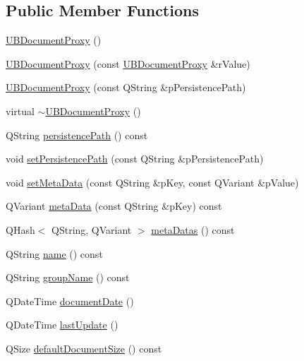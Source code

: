\subsection*{Public Member Functions}
\begin{DoxyCompactItemize}
\item 
\hyperlink{class_u_b_document_proxy_a0cd3253e9c34295bb742da0faf9e69d6}{U\-B\-Document\-Proxy} ()
\item 
\hyperlink{class_u_b_document_proxy_af5f61f69e9385d07bf09e9593bf89b0e}{U\-B\-Document\-Proxy} (const \hyperlink{class_u_b_document_proxy}{U\-B\-Document\-Proxy} \&r\-Value)
\item 
\hyperlink{class_u_b_document_proxy_ae1576ae63d7b98bd79bd60503e7b2ed1}{U\-B\-Document\-Proxy} (const Q\-String \&p\-Persistence\-Path)
\item 
virtual \hyperlink{class_u_b_document_proxy_adcb4f5600ccd006a6c04c35c4171c3a6}{$\sim$\-U\-B\-Document\-Proxy} ()
\item 
Q\-String \hyperlink{class_u_b_document_proxy_af57e2a3250ad6ae4c18fc5762e37f8a1}{persistence\-Path} () const 
\item 
void \hyperlink{class_u_b_document_proxy_a8ea853948b45db40077e4b82791db5cf}{set\-Persistence\-Path} (const Q\-String \&p\-Persistence\-Path)
\item 
void \hyperlink{class_u_b_document_proxy_a541c361c5a415640974ecf94147126b1}{set\-Meta\-Data} (const Q\-String \&p\-Key, const Q\-Variant \&p\-Value)
\item 
Q\-Variant \hyperlink{class_u_b_document_proxy_aba93539ec11aad9eb4156cb4edf246ba}{meta\-Data} (const Q\-String \&p\-Key) const 
\item 
Q\-Hash$<$ Q\-String, Q\-Variant $>$ \hyperlink{class_u_b_document_proxy_a9b1a75280159acaf824324df0a26222f}{meta\-Datas} () const 
\item 
Q\-String \hyperlink{class_u_b_document_proxy_aedacb3e1363fef8910851f8f7c4d1a7a}{name} () const 
\item 
Q\-String \hyperlink{class_u_b_document_proxy_a298cd4af6aa7311fce5d2760f9d39031}{group\-Name} () const 
\item 
Q\-Date\-Time \hyperlink{class_u_b_document_proxy_ae6794c66922fe216e4b9b189725c3ad5}{document\-Date} ()
\item 
Q\-Date\-Time \hyperlink{class_u_b_document_proxy_a8a9e3bec772fc108c933ed6dd2233279}{last\-Update} ()
\item 
Q\-Size \hyperlink{class_u_b_document_proxy_addf3e5100a1a6b16b13a6ca4ebf5b091}{default\-Document\-Size} () const 

\end{DoxyCompactItemize}
